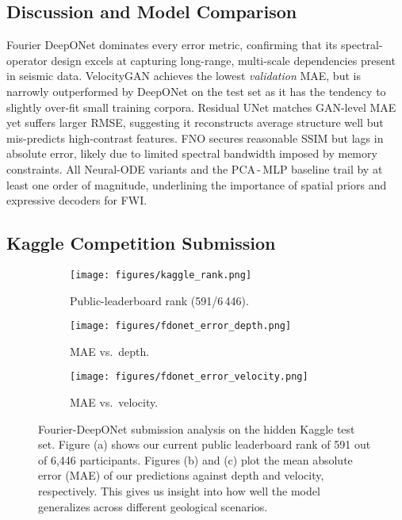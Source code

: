 \documentclass{article}
\begin{document}
\subsection{Discussion and Model Comparison}
Fourier DeepONet dominates every error metric, confirming that its
spectral-operator design excels at capturing long-range, multi-scale
dependencies present in seismic data.
VelocityGAN achieves the lowest \emph{validation} MAE, but is narrowly
outperformed by DeepONet on the test set as it has the tendency to
slightly over-fit small training corpora.
Residual UNet matches GAN-level MAE yet suffers larger RMSE, suggesting it
reconstructs average structure well but mis-predicts high-contrast features.
FNO secures reasonable SSIM but lags in absolute error, likely due to limited
spectral bandwidth imposed by memory constraints.
All Neural-ODE variants and the PCA\,-\,MLP baseline trail by at least one
order of magnitude, underlining the importance of spatial priors and expressive
decoders for FWI.

\subsection{Kaggle Competition Submission}


\begin{figure}[t]
    \centering
    \begin{subfigure}[b]{0.32\linewidth}
        \centering
        \texttt{[image: figures/kaggle\_rank.png]}
        \caption{Public-leaderboard rank (591/6\,446).}
        \label{fig:kaggle_submission}
    \end{subfigure}
    \hfill
    \begin{subfigure}[b]{0.32\linewidth}
        \centering
        \texttt{[image: figures/fdonet\_error\_depth.png]}
        \caption{MAE vs.\ depth.}
        \label{fig:fdonet_depth}
    \end{subfigure}
    \hfill
    \begin{subfigure}[b]{0.32\linewidth}
        \centering
        \texttt{[image: figures/fdonet\_error\_velocity.png]}
        \caption{MAE vs.\ velocity.}
        \label{fig:fdonet_vel}
    \end{subfigure}
    \vspace{-4pt}
    \caption{Fourier-DeepONet submission analysis on the hidden Kaggle test set. Figure (a) shows our current public leaderboard rank of 591 out of 6,446 participants. Figures (b) and (c) plot the mean absolute error (MAE) of our predictions against depth and velocity, respectively. This gives us insight into how well the model generalizes across different geological scenarios.}
    \label{fig:kaggle_triptych}
\end{figure}
\end{document}
